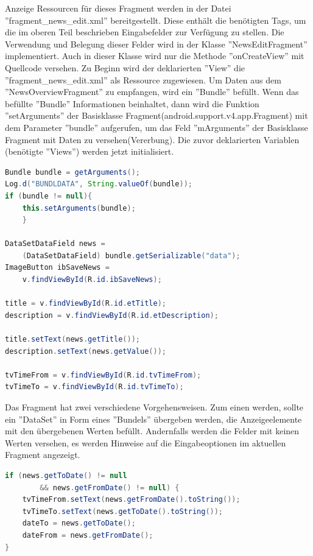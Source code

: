 Anzeige Ressourcen für dieses Fragment werden in der Datei ''fragment\_news\_edit.xml'' bereitgestellt. Diese enthält die benötigten Tags, um die im oberen Teil beschrieben Eingabefelder zur Verfügung zu stellen. Die Verwendung und Belegung dieser Felder wird in der Klasse ''NewsEditFragment'' implementiert. Auch in dieser Klasse wird  nur die Methode ''onCreateView'' mit Quellcode versehen. Zu Beginn wird der deklarierten ''View'' die ''fragment\_news\_edit.xml'' als Ressource zugewiesen. Um Daten aus dem ''NewsOverviewFragment'' zu empfangen, wird ein ''Bundle'' befüllt. Wenn das befüllte ''Bundle'' Informationen beinhaltet, dann wird die Funktion ''setArguments'' der Basisklasse Fragment(android.support.v4.app.Fragment) mit dem Parameter ''bundle'' aufgerufen, um das Feld ''mArguments'' der Basisklasse Fragment mit Daten zu versehen(Vererbung). Die zuvor deklarierten Variablen (benötigte ''Views'') werden jetzt initialisiert.
\begin{lstlisting}[language=Java,caption={Übernahme der übergebenen Werte und initialisieren der Variablen im NewsEditFragment }]
Bundle bundle = getArguments();
Log.d("BUNDLDATA", String.valueOf(bundle));
if (bundle != null){
    this.setArguments(bundle);
    }
            
DataSetDataField news =
 	(DataSetDataField) bundle.getSerializable("data");
ImageButton ibSaveNews =
  	v.findViewById(R.id.ibSaveNews);
        
title = v.findViewById(R.id.etTitle);
description = v.findViewById(R.id.etDescription);

title.setText(news.getTitle());
description.setText(news.getValue());

tvTimeFrom = v.findViewById(R.id.tvTimeFrom);
tvTimeTo = v.findViewById(R.id.tvTimeTo);
\end{lstlisting}

Das Fragment hat zwei verschiedene Vorgehensweisen. Zum einen werden, sollte ein ''DataSet'' in Form eines ''Bundels'' übergeben werden, die Anzeigeelemente mit den übergebenen Werten befüllt. Andernfalls werden die Felder mit keinen Werten versehen, es werden Hinweise auf die Eingabeoptionen im aktuellen Fragment angezeigt.

\begin{lstlisting}[language=Java,caption={Bedingung für Fragment-Recycling im NewsEditFragment}]
if (news.getToDate() != null 
		&& news.getFromDate() != null) {
    tvTimeFrom.setText(news.getFromDate().toString());
    tvTimeTo.setText(news.getToDate().toString());
    dateTo = news.getToDate();
    dateFrom = news.getFromDate();
}   
\end{lstlisting}

